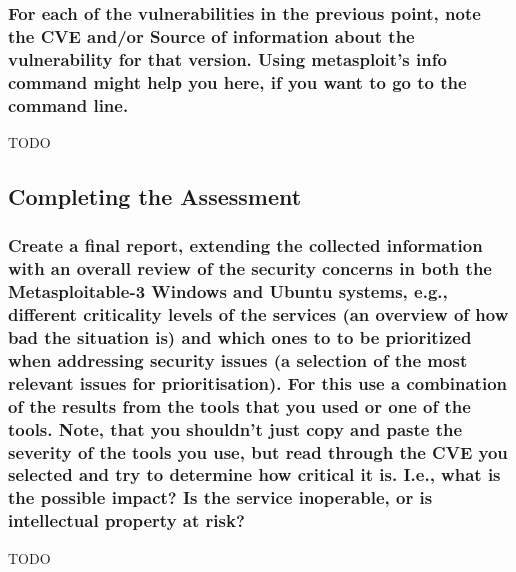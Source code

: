 \subsubsection{For each of the vulnerabilities in the previous point, note the CVE and/or Source of information about the vulnerability for that version. Using metasploit's info command might help you here, if you want to go to the command line.}
TODO

\subsection{Completing the Assessment}
\subsubsection{Create a final report, extending the collected information with an overall review of the security concerns in both the Metasploitable-3 Windows and Ubuntu systems, e.g., different criticality levels of the services (an overview of how bad the situation is) and which ones to to be prioritized when addressing security issues (a selection of the most relevant issues for prioritisation). For this use a combination of the results from the tools that you used or one of the tools. Note, that you shouldn’t just copy and paste the severity of the tools you use, but read through the CVE you selected and try to determine how critical it is. I.e., what is the possible impact? Is the service inoperable, or is intellectual property at risk?}
TODO